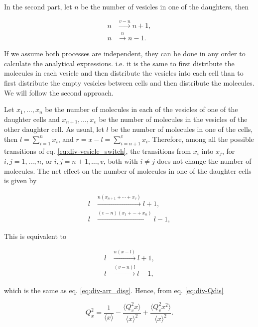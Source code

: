 In the second part, let $n$ be the number of vesicles in one of the daughters, then

\begin{equation}
  \label{eq:div-arr_clust}
  \begin{split}
    n &\xrightarrow{v-n} n+1,\\
    n &\xrightarrow{n} n-1.
  \end{split}
\end{equation}

If we assume both processes are independent, they can be done in any order to calculate the analytical expressions. i.e. it is the same to first distribute the molecules in each vesicle and then distribute the vesicles into each cell than to first distribute the empty vesicles between cells and then distribute the molecules. We will follow the second approach.

Let $x_1,\dotsc,x_n$ be the number of molecules in each of the vesicles of one of the daughter cells and $x_{n+1},\dotsc,x_v$ be the number of molecules in the vesicles of the other daughter cell. As usual, let $l$ be the number of molecules in one of the cells, then $l = \sum_{i=1}^nx_i$, and $r = x-l = \sum_{i=n+1}^vx_i$. Therefore, among all the possible transitions of eq. \eqref{eq:div-vesicle_switch}, the transitions from $x_i$ into $x_j$, for $i,j=1,\dotsc,n$, or $i,j=n+1,\dotsc,v$, both with $i\neq j$ does not change the number of molecules. The net effect on the number of molecules in one of the daughter cells is given by

\begin{equation*}
  \begin{split}
    l&\xrightarrow{n(x_{n+1}+\dotsb+x_{v})}l+1,\\
    l&\xrightarrow{(v-n)(x_1+\dotsb+x_n)}l-1,
  \end{split}
\end{equation*}

This is equivalent to

\begin{equation*}
  \begin{split}
    l&\xrightarrow{n(x-l)}l+1,\\
    l&\xrightarrow{(v-n)l}l-1,
  \end{split}
\end{equation*}

which is the same as eq. \eqref{eq:div-arr_disg}. Hence, from eq. \eqref{eq:div-Qdis}

\begin{equation}
  \label{eq:div-clus-Qx1}
  Q_x^2 = \frac{1}{\langle x\rangle} - \frac{\langle Q_v^2x\rangle}{\langle x\rangle^2} + \frac{\langle Q_v^2x^2\rangle}{\langle x\rangle^2}.
\end{equation}


